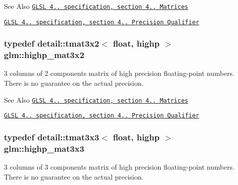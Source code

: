 \begin{DoxySeeAlso}{See Also}
\href{http://www.opengl.org/registry/doc/GLSLangSpec.4.20.8.pdf}{\tt G\-L\-S\-L 4.. specification, section 4.. Matrices} 

\href{http://www.opengl.org/registry/doc/GLSLangSpec.4.20.8.pdf}{\tt G\-L\-S\-L 4.. specification, section 4.. Precision Qualifier} 
\end{DoxySeeAlso}
\hypertarget{group__core__precision_gabc7767293ff69cd56717ee9d8be62963}{
\subsubsection[{highp\-\_\-mat3x2}]{\setlength{\rightskip}{0pt plus 5cm}typedef detail\-::tmat3x2$<$ float, highp $>$ {\bf glm\-::highp\-\_\-mat3x2}}}\label{group__core__precision_gabc7767293ff69cd56717ee9d8be62963}
3 columns of 2 components matrix of high precision floating-\/point numbers. There is no guarantee on the actual precision.

\begin{DoxySeeAlso}{See Also}
\href{http://www.opengl.org/registry/doc/GLSLangSpec.4.20.8.pdf}{\tt G\-L\-S\-L 4.. specification, section 4.. Matrices} 

\href{http://www.opengl.org/registry/doc/GLSLangSpec.4.20.8.pdf}{\tt G\-L\-S\-L 4.. specification, section 4.. Precision Qualifier} 
\end{DoxySeeAlso}
\hypertarget{group__core__precision_ga8a3703cc71cdfc8928eddf46b3763c4b}{
\subsubsection[{highp\-\_\-mat3x3}]{\setlength{\rightskip}{0pt plus 5cm}typedef detail\-::tmat3x3$<$ float, highp $>$ {\bf glm\-::highp\-\_\-mat3x3}}}\label{group__core__precision_ga8a3703cc71cdfc8928eddf46b3763c4b}
3 columns of 3 components matrix of high precision floating-\/point numbers. There is no guarantee on the actual precision.

